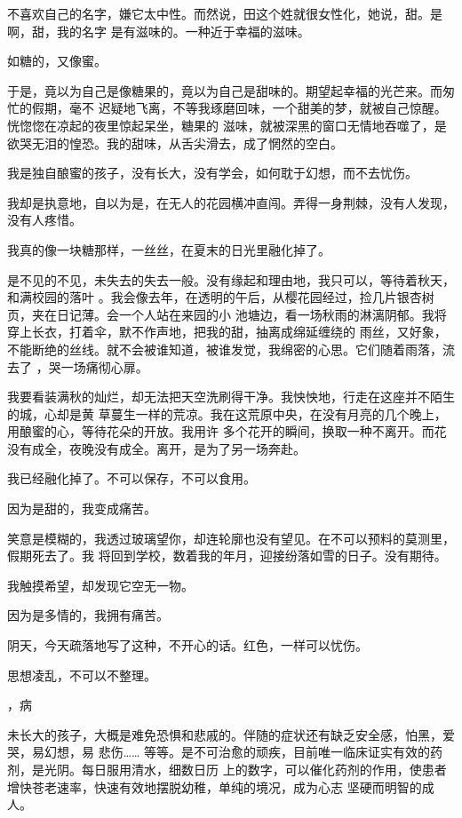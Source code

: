 \documentclass[12pt,a4paper]{article}
\newcommand{\subpart}[1]{
	\begingroup \par
	\vspace{1ex} \centering #1
	\par \endgroup
}
\begin{document}
		不喜欢自己的名字，嫌它太中性。而然说，田这个姓就很女性化，她说，甜。是啊，甜，我的名字
	是有滋味的。一种近于幸福的滋味。

		如糖的，又像蜜。

		于是，竟以为自己是像糖果的，竟以为自己是甜味的。期望起幸福的光芒来。而匆忙的假期，毫不
	迟疑地飞离，不等我琢磨回味，一个甜美的梦，就被自己惊醒。恍惚惚在凉起的夜里惊起呆坐，糖果的
	滋味，就被深黑的窗口无情地吞噬了，是欲哭无泪的惶恐。我的甜味，从舌尖滑去，成了惘然的空白。

		我是独自酿蜜的孩子，没有长大，没有学会，如何耽于幻想，而不去忧伤。

		我却是执意地，自以为是，在无人的花园横冲直闯。弄得一身荆棘，没有人发现，没有人疼惜。

		我真的像一块糖那样，一丝丝，在夏末的日光里融化掉了。

		是不见的不见，未失去的失去一般。没有缘起和理由地，我只可以，等待着秋天，和满校园的落叶
	。我会像去年，在透明的午后，从樱花园经过，捡几片银杏树页，夹在日记薄。会一个人站在来园的小
	池塘边，看一场秋雨的淋漓阴郁。我将穿上长衣，打着伞，默不作声地，把我的甜，抽离成绵延缠绕的
	雨丝，又好象，不能断绝的丝线。就不会被谁知道，被谁发觉，我绵密的心思。它们随着雨落，流去了
	，哭一场痛彻心扉。


		我要看装满秋的灿烂，却无法把天空洗刷得干净。我怏怏地，行走在这座并不陌生的城，心却是黄
	草蔓生一样的荒凉。我在这荒原中央，在没有月亮的几个晚上，用酿蜜的心，等待花朵的开放。我用许
	多个花开的瞬间，换取一种不离开。而花没有成全，夜晚没有成全。离开，是为了另一场奔赴。

		我已经融化掉了。不可以保存，不可以食用。

		因为是甜的，我变成痛苦。

		笑意是模糊的，我透过玻璃望你，却连轮廓也没有望见。在不可以预料的莫测里，假期死去了。我
	将回到学校，数着我的年月，迎接纷落如雪的日子。没有期待。

		我触摸希望，却发现它空无一物。

		因为是多情的，我拥有痛苦。

		阴天，今天疏落地写了这种，不开心的话。红色，一样可以忧伤。

	\endwriting



		思想凌乱，不可以不整理。

		\subpart{1，病}

		未长大的孩子，大概是难免恐惧和悲戚的。伴随的症状还有缺乏安全感，怕黑，爱哭，易幻想，易
	悲伤…… 等等。是不可治愈的顽疾，目前唯一临床证实有效的药剂，是光阴。每日服用清水，细数日历
	上的数字，可以催化药剂的作用，使患者增快苍老速率，快速有效地摆脱幼稚，单纯的境况，成为心志
	坚硬而明智的成人。
\end{document}
